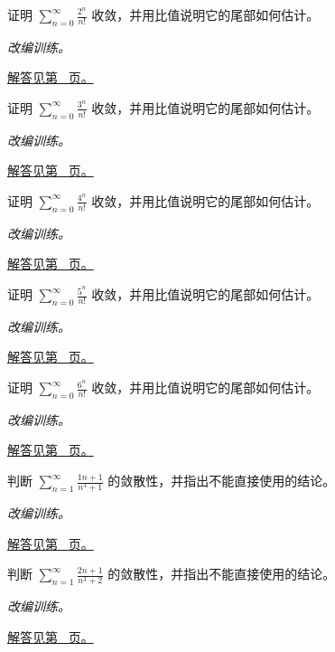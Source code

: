 \documentclass[UTF8,12pt,a4paper,fontset=fandol]{ctexart}
\begin{document}
\begin{example}[阶乘压过指数]\label{ex:c24q14}
证明 $\displaystyle\sum_{n=0}^\infty\frac{2^n}{n!}$ 收敛，并用比值说明它的尾部如何估计。
\par\textit{改编训练。}\par\hyperref[ans:c24q14]{解答见第~\pageref{ans:c24q14} 页。}
\end{example}
\begin{example}[阶乘压过指数]\label{ex:c24q15}
证明 $\displaystyle\sum_{n=0}^\infty\frac{3^n}{n!}$ 收敛，并用比值说明它的尾部如何估计。
\par\textit{改编训练。}\par\hyperref[ans:c24q15]{解答见第~\pageref{ans:c24q15} 页。}
\end{example}
\begin{example}[阶乘压过指数]\label{ex:c24q16}
证明 $\displaystyle\sum_{n=0}^\infty\frac{4^n}{n!}$ 收敛，并用比值说明它的尾部如何估计。
\par\textit{改编训练。}\par\hyperref[ans:c24q16]{解答见第~\pageref{ans:c24q16} 页。}
\end{example}
\begin{example}[阶乘压过指数]\label{ex:c24q17}
证明 $\displaystyle\sum_{n=0}^\infty\frac{5^n}{n!}$ 收敛，并用比值说明它的尾部如何估计。
\par\textit{改编训练。}\par\hyperref[ans:c24q17]{解答见第~\pageref{ans:c24q17} 页。}
\end{example}
\begin{example}[阶乘压过指数]\label{ex:c24q18}
证明 $\displaystyle\sum_{n=0}^\infty\frac{6^n}{n!}$ 收敛，并用比值说明它的尾部如何估计。
\par\textit{改编训练。}\par\hyperref[ans:c24q18]{解答见第~\pageref{ans:c24q18} 页。}
\end{example}
\begin{example}[极限比较与主导次数]\label{ex:c24q19}
判断 $\displaystyle\sum_{n=1}^\infty\frac{1n+1}{n^3+1}$ 的敛散性，并指出不能直接使用的结论。
\par\textit{改编训练。}\par\hyperref[ans:c24q19]{解答见第~\pageref{ans:c24q19} 页。}
\end{example}
\begin{example}[极限比较与主导次数]\label{ex:c24q20}
判断 $\displaystyle\sum_{n=1}^\infty\frac{2n+1}{n^3+2}$ 的敛散性，并指出不能直接使用的结论。
\par\textit{改编训练。}\par\hyperref[ans:c24q20]{解答见第~\pageref{ans:c24q20} 页。}
\end{example}
\end{document}
